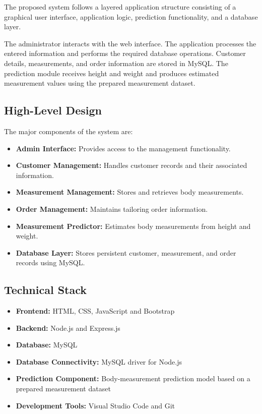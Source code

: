 \documentclass[12pt,a4paper]{report}
\begin{document}
The proposed system follows a layered application structure consisting of a
graphical user interface, application logic, prediction functionality, and a
database layer.

The administrator interacts with the web interface. The application
processes the entered information and performs the required database
operations. Customer details, measurements, and order information are stored
in MySQL. The prediction module receives height and weight and produces
estimated measurement values using the prepared measurement dataset.

\subsection{High-Level Design}

The major components of the system are:

\begin{itemize}
  \item \textbf{Admin Interface:} Provides access to the management
        functionality.
  \item \textbf{Customer Management:} Handles customer records and their
        associated information.
  \item \textbf{Measurement Management:} Stores and retrieves body
        measurements.
  \item \textbf{Order Management:} Maintains tailoring order information.
  \item \textbf{Measurement Predictor:} Estimates body measurements from
        height and weight.
  \item \textbf{Database Layer:} Stores persistent customer, measurement,
        and order records using MySQL.
\end{itemize}

\subsection{Technical Stack}

\begin{itemize}
  \item \textbf{Frontend:} HTML, CSS, JavaScript and Bootstrap
  \item \textbf{Backend:} Node.js and Express.js
  \item \textbf{Database:} MySQL
  \item \textbf{Database Connectivity:} MySQL driver for Node.js
  \item \textbf{Prediction Component:} Body-measurement prediction model
        based on a prepared measurement dataset
  \item \textbf{Development Tools:} Visual Studio Code and Git
\end{itemize}
\end{document}
